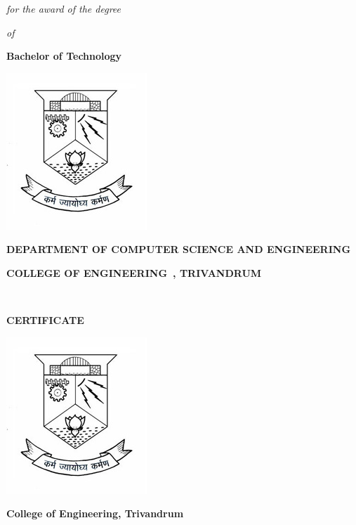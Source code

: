 \maketitle
\begin{center}
 {\it\large for the award of the degree}
\end{center}
\begin{center}
 {\it\large of}
\end{center}
\begin{center}
 {\bf\Large Bachelor of Technology}
\end{center}

\begin{center}
\includegraphics[scale=.8]{images/logo.jpg}
\end{center}
\vspace{.28cm}

\begin{center}
{\bf\large DEPARTMENT OF COMPUTER SCIENCE AND ENGINEERING}

\vspace{.35cm}
{\bf\large COLLEGE OF ENGINEERING\ , TRIVANDRUM}
\begin{center}{\large {}}\\[1cm]\end{center}
\end{center}

\newpage

\begin{center}
{\bf{\LARGE CERTIFICATE}}
\end{center}
\vspace{.1cm}
\begin{center}
\includegraphics[scale=.45]{images/logo.jpg}
\end{center}
\begin{center}
\textbf{\Large College of Engineering,
Trivandrum}
\end{center}

